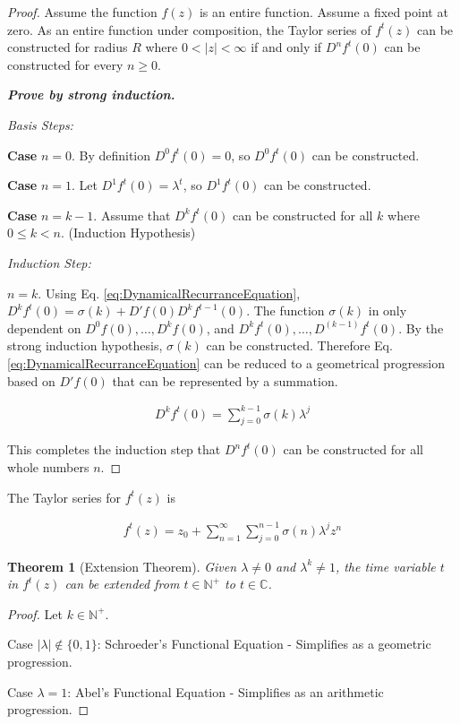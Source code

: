 \documentclass{article}
\newtheorem{theorem}{Theorem}[section]
\theoremstyle{definition}
\begin{document}
\begin{proof}
Assume the function $f(z)$ is an entire function. Assume a fixed point at zero. As an entire function under composition, the Taylor series of $f^t(z)$ can be constructed for radius $R$ where $0 < |z| < \infty$ if and only if $D^n f^t(0)$ can be constructed for every $n \geq 0$. 

\emph{\textbf{Prove by strong induction.}} 

\emph{Basis Steps:} 

\textbf{Case} $n=0$. By definition $D^0 f^t(0) = 0$, so $D^0 f^t(0)$ can be constructed.

\textbf{Case} $n=1$. Let $D^1 f^t(0) = \lambda^t$, so $D^1 f^t(0)$ can be constructed.

\textbf{Case} $n=k-1$. Assume that $D^k f^t(0)$ can be constructed for all $k$ where $0 \leq k < n$. (Induction Hypothesis) 

\emph{Induction Step:}

$n=k$.
Using Eq. \ref{eq:DynamicalRecurranceEquation}, $D^k f^t(0)=\sigma(k) + D'f(0) D^k f^{t-1}(0)$. The function $\sigma(k)$ in only dependent on $D^0 f(0), \ldots, D^k f(0)$, and $D^k f^t(0), \ldots, D^{(k-1)} f^t(0)$. By the strong induction hypothesis, $\sigma(k)$ can be constructed. Therefore Eq. \ref{eq:DynamicalRecurranceEquation} can be reduced to a geometrical progression based on $D'f(0)$ that can be represented by a summation. 

\begin{eqnarray}
D^k f^t(0) = \sum_{j=0}^{k-1} \sigma(k) \lambda^j
\end{eqnarray}

This completes the induction step that $D^n f^t(0)$ can be constructed for all whole numbers $n$. 
\end{proof}

The Taylor series for $f^t(z)$ is

\begin{eqnarray}
f^t(z) = z_0+ \sum_{n=1}^\infty \sum_{j=0}^{n-1} \sigma(n) \lambda^j z^n
\label{eq:Dynamical Equation}
\end{eqnarray}

\begin{theorem}[Extension Theorem]
Given $\lambda \neq 0$ and $\lambda^k \neq 1$, the time variable $t$ in $f^t(z)$ can be extended from $t \in \mathbb{N^+}$ to $t \in \mathbb{C}$.
\end{theorem}

\begin{proof}
Let $k \in \mathbb{N^+}$. 

Case $|\lambda| \notin \{0,1\}$: Schroeder's Functional Equation - Simplifies as a geometric progression.

Case $\lambda = 1$: Abel's Functional Equation - Simplifies as an arithmetic progression.
\end{proof}
\end{document}
